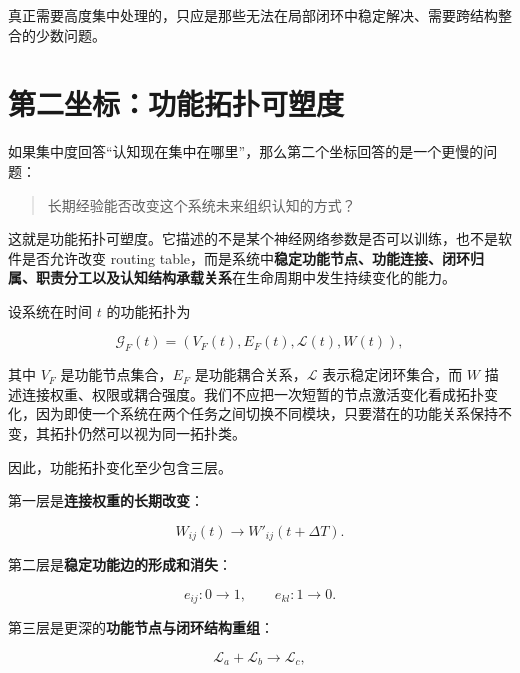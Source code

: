 \begin{statementbox}
\centering
{}
\end{statementbox}

真正需要高度集中处理的，只应是那些无法在局部闭环中稳定解决、需要跨结构整合的少数问题。

\section{第二坐标：功能拓扑可塑度}
\label{sec:topological_plasticity}

如果集中度回答“认知现在集中在哪里”，那么第二个坐标回答的是一个更慢的问题：

\begin{quote}
长期经验能否改变这个系统未来组织认知的方式？
\end{quote}

这就是功能拓扑可塑度。它描述的不是某个神经网络参数是否可以训练，也不是软件是否允许改变 routing table，而是系统中\textbf{稳定功能节点、功能连接、闭环归属、职责分工以及认知结构承载关系}在生命周期中发生持续变化的能力。

设系统在时间 $t$ 的功能拓扑为

\begin{equation}
\mathcal{G}_{F}(t)
=
\left(
V_F(t),
E_F(t),
\mathcal{L}(t),
W(t)
\right),
\end{equation}

其中 $V_F$ 是功能节点集合，$E_F$ 是功能耦合关系，$\mathcal{L}$ 表示稳定闭环集合，而 $W$ 描述连接权重、权限或耦合强度。我们不应把一次短暂的节点激活变化看成拓扑变化，因为即使一个系统在两个任务之间切换不同模块，只要潜在的功能关系保持不变，其拓扑仍然可以视为同一拓扑类。

因此，功能拓扑变化至少包含三层。

第一层是\textbf{连接权重的长期改变}：

\begin{equation}
W_{ij}(t)
\rightarrow
W'_{ij}(t+\Delta T).
\end{equation}

第二层是\textbf{稳定功能边的形成和消失}：

\begin{equation}
e_{ij}:0\rightarrow1,
\qquad
e_{kl}:1\rightarrow0.
\end{equation}

第三层是更深的\textbf{功能节点与闭环结构重组}：

\begin{equation}
\mathcal{L}_{a}
+
\mathcal{L}_{b}
\rightarrow
\mathcal{L}_{c},
\end{equation}

